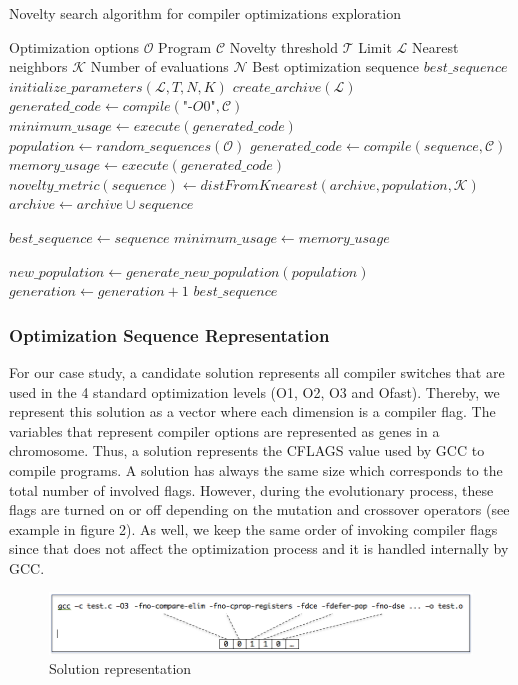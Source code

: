 \begin{algorithm}
  \footnotesize
	\caption{Novelty search algorithm for compiler optimizations exploration}
	\label{algo:search}
	\begin{algorithmic}[1]
	
		\REQUIRE Optimization options $\mathcal{O}$
		\REQUIRE Program $\mathcal{C}$
		\REQUIRE Novelty threshold $\mathcal{T}$
		\REQUIRE Limit $\mathcal{L}$
		\REQUIRE Nearest neighbors $\mathcal{K}$
		\REQUIRE Number of evaluations $\mathcal{N}$
		\ENSURE Best optimization sequence $best\_sequence$
		\STATE $initialize\_parameters(\mathcal{L},T,N,K)$
		\STATE $create\_archive(\mathcal{L})$
		\STATE 	$generated\_code \gets compile(\textit{"-O0"},\mathcal{C})$
		\STATE 	$minimum\_usage \gets execute(generated\_code)$
		\STATE $population \gets random\_sequences(\mathcal{O})$
		\REPEAT
		\STATE 	$generated\_code \gets compile(sequence,\mathcal{C})$
		\STATE 	$memory\_usage \gets execute(generated\_code)$
		\STATE	$novelty\_metric(sequence) \gets distFromKnearest(archive,population,\mathcal{K})$
		\STATE	$archive \gets archive \cup sequence$
		\ENDIF
		
			\STATE	$best\_sequence \gets sequence$
			\STATE	$minimum\_usage \gets memory\_usage$
			\ENDIF
			
		\ENDFOR
		\STATE		$new\_population \gets generate\_new\_population(population)$
		\STATE		$generation \gets generation + 1$
		\RETURN $best\_sequence$
	\end{algorithmic}
\end{algorithm}


\subsubsection{Optimization Sequence Representation}
For our case study, a candidate solution represents all compiler switches that are used in the 4 standard optimization levels (O1, O2, O3 and Ofast). Thereby, we represent this solution as a vector where each dimension is a compiler flag. 
The variables that represent compiler options are represented as genes in a chromosome. 
Thus, a solution represents the CFLAGS value used by GCC to compile programs.
A solution has always the same size which corresponds to the total number of involved flags. 
However, during the evolutionary process, these flags are turned on or off depending on the mutation and crossover operators (see example in figure 2). As well, we keep the same order of invoking compiler flags since that does not affect the optimization process and it is handled internally by GCC.
\begin{figure}[h]
	\centering
	\includegraphics[width=1\hsize]{Ressources/individual.png}
	\caption{Solution representation}
\end{figure}
